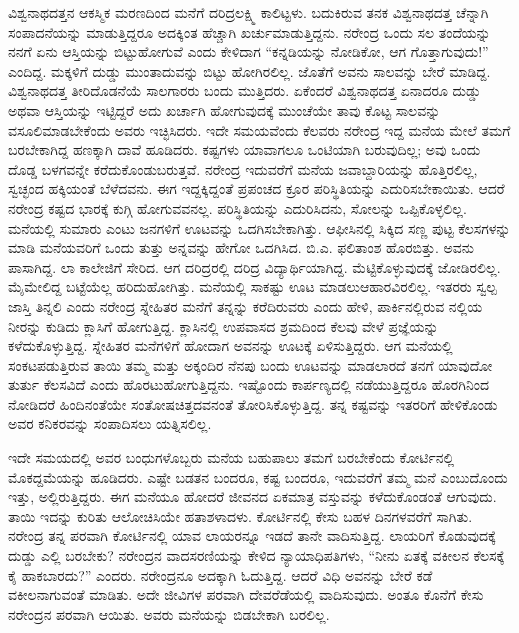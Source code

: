 ವಿಶ್ವನಾಥದತ್ತನ ಆಕಸ್ಮಿಕ ಮರಣದಿಂದ ಮನೆಗೆ ದರಿದ್ರಲಕ್ಷ್ಮಿ ಕಾಲಿಟ್ಟಳು. ಬದುಕಿರುವ ತನಕ ವಿಶ್ವನಾಥದತ್ತ ಚೆನ್ನಾಗಿ ಸಂಪಾದನೆಯನ್ನು ಮಾಡುತ್ತಿದ್ದರೂ ಅದಕ್ಕಿಂತ ಹೆಚ್ಚಾಗಿ ಖರ್ಚುಮಾಡುತ್ತಿದ್ದನು. ನರೇಂದ್ರ ಒಂದು ಸಲ ತಂದೆಯನ್ನು ನನಗೆ ಏನು ಆಸ್ತಿಯನ್ನು ಬಿಟ್ಟುಹೋಗುವೆ ಎಂದು ಕೇಳಿದಾಗ “ಕನ್ನಡಿಯನ್ನು ನೋಡಿಕೋ, ಆಗ ಗೊತ್ತಾಗುವುದು!” ಎಂದಿದ್ದ. ಮಕ್ಕಳಿಗೆ ದುಡ್ಡು ಮುಂತಾದುವನ್ನು ಬಿಟ್ಟು ಹೋಗಿರಲಿಲ್ಲ. ಜೊತೆಗೆ ಅವನು ಸಾಲವನ್ನು ಬೇರೆ ಮಾಡಿದ್ದ. ವಿಶ್ವನಾಥದತ್ತ ತೀರಿದೊಡನೆಯೆ ಸಾಲಗಾರರು ಬಂದು ಮುತ್ತಿದರು. ಏಕೆಂದರೆ ವಿಶ್ವನಾಥದತ್ತ ಏನಾದರೂ ದುಡ್ಡು ಅಥವಾ ಆಸ್ತಿಯನ್ನು ಇಟ್ಟಿದ್ದರೆ ಅದು ಖರ್ಚಾಗಿ ಹೋಗುವುದಕ್ಕೆ ಮುಂಚೆಯೇ ತಾವು ಕೊಟ್ಟ ಸಾಲವನ್ನು ವಸೂಲಿಮಾಡಬೇಕೆಂದು ಅವರು ಇಚ್ಛಿಸಿದರು. ಇದೇ ಸಮಯವೆಂದು ಕೆಲವರು ನರೇಂದ್ರ ಇದ್ದ ಮನೆಯ ಮೇಲೆ ತಮಗೆ ಬರಬೇಕಾಗಿದ್ದ ಹಣಕ್ಕಾಗಿ ದಾವೆ ಹೂಡಿದರು. ಕಷ್ಟಗಳು ಯಾವಾಗಲೂ ಒಂಟಿಯಾಗಿ ಬರುವುದಿಲ್ಲ; ಅವು ಒಂದು ದೊಡ್ಡ ಬಳಗವನ್ನೇ ಕರೆದುಕೊಂಡುಬರುತ್ತವೆ. ನರೇಂದ್ರ ಇದುವರೆಗೆ ಮನೆಯ ಜವಾಬ್ದಾರಿಯನ್ನು ಹೊತ್ತಿರಲಿಲ್ಲ, ಸ್ವಚ್ಛಂದ ಹಕ್ಕಿಯಂತೆ ಬೆಳೆದವನು. ಈಗ ಇದ್ದಕ್ಕಿದ್ದಂತೆ ಪ್ರಪಂಚದ ಕ್ರೂರ ಪರಿಸ್ಥಿತಿಯನ್ನು ಎದುರಿಸಬೇಕಾಯಿತು. ಆದರೆ ನರೇಂದ್ರ ಕಷ್ಟದ ಭಾರಕ್ಕೆ ಕುಗ್ಗಿ ಹೋಗುವವನಲ್ಲ. ಪರಿಸ್ಥಿತಿಯನ್ನು ಎದುರಿಸಿದನು, ಸೋಲನ್ನು ಒಪ್ಪಿಕೊಳ್ಳಲಿಲ್ಲ. ಮನೆಯಲ್ಲಿ ಸುಮಾರು ಎಂಟು ಜನಗಳಿಗೆ ಊಟವನ್ನು ಒದಗಿಸಬೇಕಾಗಿತ್ತು. ಆಫೀಸಿನಲ್ಲಿ ಸಿಕ್ಕಿದ ಸಣ್ಣ ಪುಟ್ಟ ಕೆಲಸಗಳನ್ನು ಮಾಡಿ ಮನೆಯವರಿಗೆ ಒಂದು ತುತ್ತು ಅನ್ನವನ್ನು ಹೇಗೋ ಒದಗಿಸಿದ. ಬಿ.ಎ. ಫಲಿತಾಂಶ ಹೊರಬಿತ್ತು. ಅವನು ಪಾಸಾಗಿದ್ದ. ಲಾ ಕಾಲೇಜಿಗೆ ಸೇರಿದ. ಆಗ ದರಿದ್ರರಲ್ಲಿ ದರಿದ್ರ ವಿದ್ಯಾರ್ಥಿಯಾಗಿದ್ದ. ಮೆಟ್ಟಿಕೊಳ್ಳುವುದಕ್ಕೆ ಜೋಡಿರಲಿಲ್ಲ. ಮೈಮೇಲಿದ್ದ ಬಟ್ಟೆಯೆಲ್ಲ ಹರಿದುಹೋಗಿತ್ತು. ಮನೆಯಲ್ಲಿ ಸಾಕಷ್ಟು ಊಟ ಮಾಡಲು\break ಆಹಾರವಿರಲಿಲ್ಲ. ಇತರರು ಸ್ವಲ್ಪ ಜಾಸ್ತಿ ತಿನ್ನಲಿ ಎಂದು ನರೇಂದ್ರ ಸ್ನೇಹಿತರ ಮನೆಗೆ ತನ್ನನ್ನು ಕರೆದಿರುವರು ಎಂದು ಹೇಳಿ, ಪಾರ್ಕಿನಲ್ಲಿರುವ ನಲ್ಲಿಯ ನೀರನ್ನು ಕುಡಿದು ಕ್ಲಾಸಿಗೆ ಹೋಗುತ್ತಿದ್ದ. ಕ್ಲಾಸಿನಲ್ಲಿ ಉಪವಾಸದ ಶ್ರಮದಿಂದ ಕೆಲವು ವೇಳೆ ಪ್ರಜ್ಞೆಯನ್ನು ಕಳೆದುಕೊಳ್ಳುತ್ತಿದ್ದ. ಸ್ನೇಹಿತರ ಮನೆಗಳಿಗೆ ಹೋದಾಗ ಅವನನ್ನು ಊಟಕ್ಕೆ ಏಳಿಸುತ್ತಿದ್ದರು. ಆಗ ಮನೆಯಲ್ಲಿ ಸಂಕಟಪಡುತ್ತಿರುವ ತಾಯಿ ತಮ್ಮ ಮತ್ತು ಅಕ್ಕಂದಿರ ನೆನಪು ಬಂದು ಊಟವನ್ನು ಮಾಡಲಾರದೆ ತನಗೆ ಯಾವುದೋ ತುರ್ತು ಕೆಲಸವಿದೆ ಎಂದು ಹೊರಟುಹೋಗುತ್ತಿದ್ದನು. ಇಷ್ಟೊಂದು ಕಾರ್ಪಣ್ಯದಲ್ಲಿ ನಡೆಯುತ್ತಿದ್ದರೂ ಹೊರಗಿನಿಂದ ನೋಡಿದರೆ ಹಿಂದಿನಂತೆಯೇ ಸಂತೋಷಚಿತ್ತದವನಂತೆ ತೋರಿಸಿಕೊಳ್ಳುತ್ತಿದ್ದ. ತನ್ನ ಕಷ್ಟವನ್ನು ಇತರರಿಗೆ ಹೇಳಿಕೊಂಡು ಅವರ ಕನಿಕರವನ್ನು ಸಂಪಾದಿಸಲು ಯತ್ನಿಸಲಿಲ್ಲ.

ಇದೇ ಸಮಯದಲ್ಲಿ ಅವರ ಬಂಧುಗಳೊಬ್ಬರು ಮನೆಯ ಬಹುಪಾಲು ತಮಗೆ ಬರಬೇಕೆಂದು ಕೋರ್ಟಿನಲ್ಲಿ ಮೊಕದ್ದಮೆಯನ್ನು ಹೂಡಿದರು. ಎಷ್ಟೇ ಬಡತನ ಬಂದರೂ, ಕಷ್ಟ ಬಂದರೂ, ಇದುವರೆಗೆ ತಮ್ಮ ಮನೆ ಎಂಬುದೊಂದು ಇತ್ತು, ಅಲ್ಲಿರುತ್ತಿದ್ದರು. ಈಗ ಮನೆಯೂ ಹೋದರೆ ಜೀವನದ ಏಕಮಾತ್ರ ವಸ್ತುವನ್ನು ಕಳೆದುಕೊಂಡಂತೆ ಆಗುವುದು. ತಾಯಿ ಇದನ್ನು ಕುರಿತು ಆಲೋಚಿಸಿಯೇ ಹತಾಶಳಾದಳು. ಕೋರ್ಟಿನಲ್ಲಿ ಕೇಸು ಬಹಳ ದಿನಗಳವರೆಗೆ ಸಾಗಿತು. ನರೇಂದ್ರ ತನ್ನ ಪರವಾಗಿ ಕೋರ್ಟಿನಲ್ಲಿ ಯಾವ ಲಾಯರನ್ನೂ ಇಡದೆ ತಾನೇ ವಾದಿಸುತ್ತಿದ್ದ. ಲಾಯರಿಗೆ ಕೊಡುವುದಕ್ಕೆ ದುಡ್ಡು ಎಲ್ಲಿ ಬರಬೇಕು? ನರೇಂದ್ರನ ವಾದಸರಣಿಯನ್ನು ಕೇಳಿದ ನ್ಯಾಯಾಧಿಪತಿಗಳು, “ನೀನು ಏತಕ್ಕೆ ವಕೀಲನ ಕೆಲಸಕ್ಕೆ ಕೈ ಹಾಕಬಾರದು?” ಎಂದರು. ನರೇಂದ್ರನೂ ಅದಕ್ಕಾಗಿ ಓದುತ್ತಿದ್ದ. ಆದರೆ ವಿಧಿ ಅವನನ್ನು ಬೇರೆ ಕಡೆ ವಕೀಲನಾಗುವಂತೆ ಮಾಡಿತು. ಅದೇ ಜೀವಿಗಳ ಪರವಾಗಿ ದೇವರೆಡೆಯಲ್ಲಿ ವಾದಿಸುವುದು. ಅಂತೂ ಕೊನೆಗೆ ಕೇಸು ನರೇಂದ್ರನ ಪರವಾಗಿ ಆಯಿತು. ಅವರು ಮನೆಯನ್ನು ಬಿಡಬೇಕಾಗಿ ಬರಲಿಲ್ಲ.

